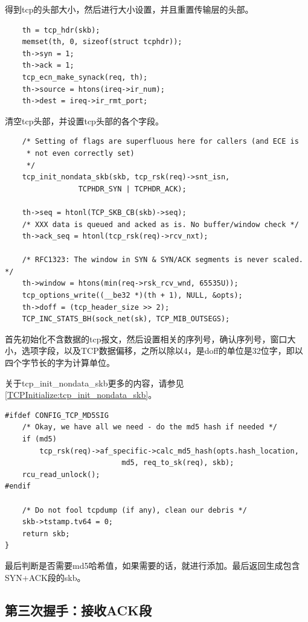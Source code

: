    得到tcp的头部大小，然后进行大小设置，并且重置传输层的头部。

\begin{verbatim}
    th = tcp_hdr(skb);
    memset(th, 0, sizeof(struct tcphdr));
    th->syn = 1;
    th->ack = 1;
    tcp_ecn_make_synack(req, th);
    th->source = htons(ireq->ir_num);
    th->dest = ireq->ir_rmt_port;
\end{verbatim}

    清空tcp头部，并设置tcp头部的各个字段。

\begin{verbatim}
    /* Setting of flags are superfluous here for callers (and ECE is
     * not even correctly set)
     */
    tcp_init_nondata_skb(skb, tcp_rsk(req)->snt_isn,
                 TCPHDR_SYN | TCPHDR_ACK);

    th->seq = htonl(TCP_SKB_CB(skb)->seq);
    /* XXX data is queued and acked as is. No buffer/window check */
    th->ack_seq = htonl(tcp_rsk(req)->rcv_nxt);

    /* RFC1323: The window in SYN & SYN/ACK segments is never scaled. */
    th->window = htons(min(req->rsk_rcv_wnd, 65535U));
    tcp_options_write((__be32 *)(th + 1), NULL, &opts);
    th->doff = (tcp_header_size >> 2);
    TCP_INC_STATS_BH(sock_net(sk), TCP_MIB_OUTSEGS);
\end{verbatim}

    首先初始化不含数据的tcp报文，然后设置相关的序列号，确认序列号，窗口大小，选项字段，以及TCP数据偏移，之所以除以4，是doff的单位是32位字，即以四个字节长的字为计算单位。
           
    关于tcp\_init\_nondata\_skb更多的内容，请参见\ref{TCPInitialize:tcp_init_nondata_skb}。
     
\begin{verbatim}
#ifdef CONFIG_TCP_MD5SIG
    /* Okay, we have all we need - do the md5 hash if needed */
    if (md5)
        tcp_rsk(req)->af_specific->calc_md5_hash(opts.hash_location,
                           md5, req_to_sk(req), skb);
    rcu_read_unlock();
#endif

    /* Do not fool tcpdump (if any), clean our debris */
    skb->tstamp.tv64 = 0;
    return skb;
}
\end{verbatim}

    最后判断是否需要md5哈希值，如果需要的话，就进行添加。最后返回生成包含SYN+ACK段的skb。  

        \subsection{第三次握手：接收ACK段}

